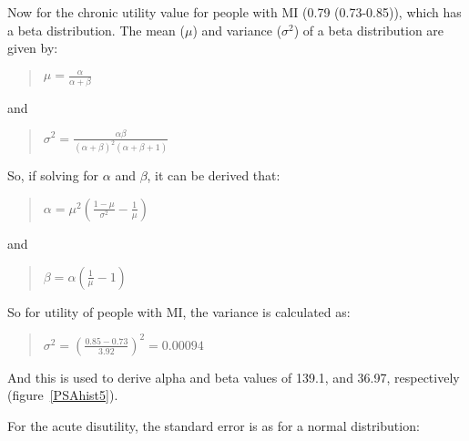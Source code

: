 \documentclass[11pt]{article}
\begin{document}
Now for the chronic utility value for people with MI (0.79 (0.73-0.85)), which has a beta distribution. 
The mean (\begin{math} \mu \end{math}) and variance (\begin{math} \sigma^2 \end{math})
of a beta distribution are given by:

\begin{quote}
\begin{math} 
\mu = \frac{\alpha}{\alpha + \beta}
\end{math}
\end{quote}

and

\begin{quote}
\begin{math} 
\sigma^2 = \frac{\alpha \beta}{(\alpha + \beta)^2 (\alpha + \beta + 1)}
\end{math}
\end{quote}

So, if solving for \begin{math} \alpha \end{math} and \begin{math} \beta \end{math}, it can be derived that:

\begin{quote}
\begin{math} 
\alpha = \mu^2 (\frac{1-\mu}{\sigma^2}-\frac{1}{\mu})
\end{math}
\end{quote}

and

\begin{quote}
\begin{math} 
\beta = \alpha (\frac{1}{\mu}-1)
\end{math}
\end{quote}

So for utility of people with MI, the variance is calculated as: 

\begin{quote}
\begin{math} 
\sigma^2 = (\frac{0.85-0.73}{3.92})^2 = 0.00094
\end{math}
\end{quote}

And this is used to derive alpha and beta values of 139.1, and 36.97, respectively (figure~\ref{PSAhist5}).

For the acute disutility, the standard error is as for a normal distribution:
\end{document}
